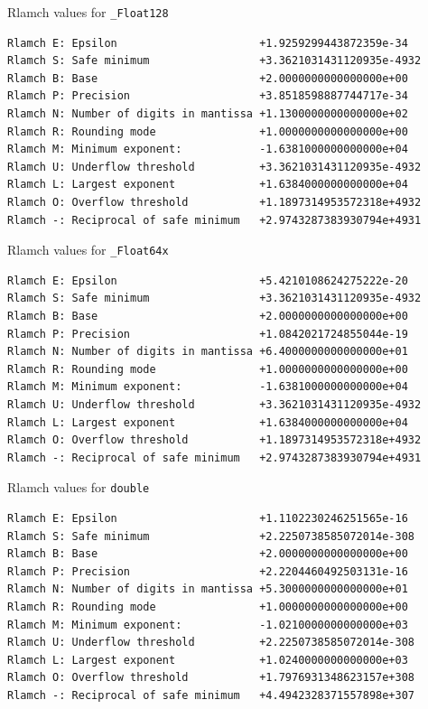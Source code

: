 \documentclass[12pt]{article}
\begin{document}
\begin{table}
\caption{Rlamch values for {\tt \_Float128}}\label{rlamch_float128}
\begin{center}
\begin{verbatim}
Rlamch E: Epsilon                      +1.9259299443872359e-34
Rlamch S: Safe minimum                 +3.3621031431120935e-4932
Rlamch B: Base                         +2.0000000000000000e+00
Rlamch P: Precision                    +3.8518598887744717e-34
Rlamch N: Number of digits in mantissa +1.1300000000000000e+02
Rlamch R: Rounding mode                +1.0000000000000000e+00
Rlamch M: Minimum exponent:            -1.6381000000000000e+04
Rlamch U: Underflow threshold          +3.3621031431120935e-4932
Rlamch L: Largest exponent             +1.6384000000000000e+04
Rlamch O: Overflow threshold           +1.1897314953572318e+4932
Rlamch -: Reciprocal of safe minimum   +2.9743287383930794e+4931
\end{verbatim}
\end{center}
\end{table}

\begin{table}
\caption{Rlamch values for {\tt \_Float64x}}\label{rlamch_float64x}
\begin{center}
\begin{verbatim}
Rlamch E: Epsilon                      +5.4210108624275222e-20
Rlamch S: Safe minimum                 +3.3621031431120935e-4932
Rlamch B: Base                         +2.0000000000000000e+00
Rlamch P: Precision                    +1.0842021724855044e-19
Rlamch N: Number of digits in mantissa +6.4000000000000000e+01
Rlamch R: Rounding mode                +1.0000000000000000e+00
Rlamch M: Minimum exponent:            -1.6381000000000000e+04
Rlamch U: Underflow threshold          +3.3621031431120935e-4932
Rlamch L: Largest exponent             +1.6384000000000000e+04
Rlamch O: Overflow threshold           +1.1897314953572318e+4932
Rlamch -: Reciprocal of safe minimum   +2.9743287383930794e+4931
\end{verbatim}
\end{center}
\end{table}

\begin{table}
\caption{Rlamch values for {\tt double}}\label{rlamch_double}
\begin{center}
\begin{verbatim}
Rlamch E: Epsilon                      +1.1102230246251565e-16
Rlamch S: Safe minimum                 +2.2250738585072014e-308
Rlamch B: Base                         +2.0000000000000000e+00
Rlamch P: Precision                    +2.2204460492503131e-16
Rlamch N: Number of digits in mantissa +5.3000000000000000e+01
Rlamch R: Rounding mode                +1.0000000000000000e+00
Rlamch M: Minimum exponent:            -1.0210000000000000e+03
Rlamch U: Underflow threshold          +2.2250738585072014e-308
Rlamch L: Largest exponent             +1.0240000000000000e+03
Rlamch O: Overflow threshold           +1.7976931348623157e+308
Rlamch -: Reciprocal of safe minimum   +4.4942328371557898e+307
\end{verbatim}
\end{center}
\end{table}
\end{document}

